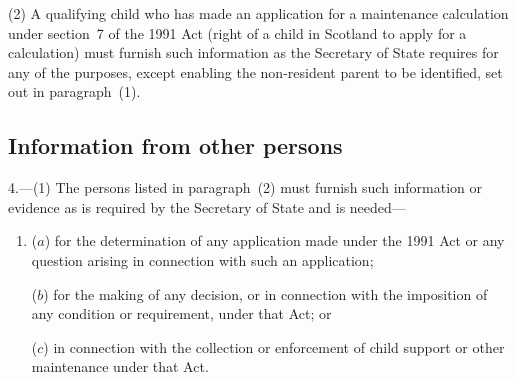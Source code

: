 \documentclass[12pt,a4paper]{article}
\begin{document}
(2) A qualifying child who has made an application for a maintenance calculation under section~7 of the 1991 Act (right of a child in Scotland to apply for a calculation) must furnish such information as the 
Secretary of State  %
requires for any of the purposes, except enabling the non-resident parent to be identified, set out in paragraph~(1).


\subsection[4. Information from other persons]{Information from other persons}

4.---(1)  The persons listed in paragraph~(2) must furnish such information or evidence as is required by the 
Secretary of State  %
and is needed—
\begin{enumerate}\item[]
($a$) for the determination of any application made under the 1991 Act or any question arising in connection with such an application;

($b$) for the making of any decision, or in connection with the imposition of any condition or requirement, under that Act; or

($c$) in connection with the collection or enforcement of child support or other maintenance under that Act.
\end{enumerate}
\end{document}
